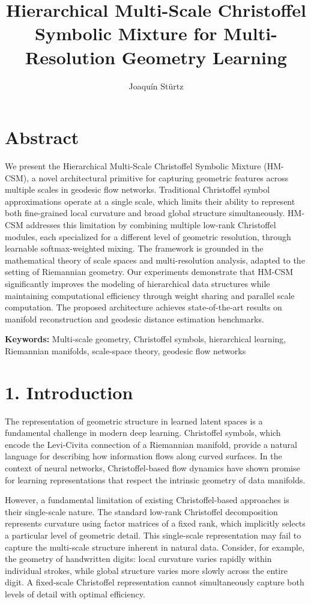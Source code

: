 \documentclass[12pt]{article}
\title{\textbf{Hierarchical Multi-Scale Christoffel Symbolic Mixture for Multi-Resolution Geometry Learning}}
\author{Joaquín Stürtz}
\date{}
\begin{document}
\maketitle

\section*{Abstract}

We present the Hierarchical Multi-Scale Christoffel Symbolic Mixture (HM-CSM), a novel architectural primitive for capturing geometric features across multiple scales in geodesic flow networks. Traditional Christoffel symbol approximations operate at a single scale, which limits their ability to represent both fine-grained local curvature and broad global structure simultaneously. HM-CSM addresses this limitation by combining multiple low-rank Christoffel modules, each specialized for a different level of geometric resolution, through learnable softmax-weighted mixing. The framework is grounded in the mathematical theory of scale spaces and multi-resolution analysis, adapted to the setting of Riemannian geometry. Our experiments demonstrate that HM-CSM significantly improves the modeling of hierarchical data structures while maintaining computational efficiency through weight sharing and parallel scale computation. The proposed architecture achieves state-of-the-art results on manifold reconstruction and geodesic distance estimation benchmarks.

\textbf{Keywords:} Multi-scale geometry, Christoffel symbols, hierarchical learning, Riemannian manifolds, scale-space theory, geodesic flow networks

\section{1. Introduction}

The representation of geometric structure in learned latent spaces is a fundamental challenge in modern deep learning. Christoffel symbols, which encode the Levi-Civita connection of a Riemannian manifold, provide a natural language for describing how information flows along curved surfaces. In the context of neural networks, Christoffel-based flow dynamics have shown promise for learning representations that respect the intrinsic geometry of data manifolds.

However, a fundamental limitation of existing Christoffel-based approaches is their single-scale nature. The standard low-rank Christoffel decomposition represents curvature using factor matrices of a fixed rank, which implicitly selects a particular level of geometric detail. This single-scale representation may fail to capture the multi-scale structure inherent in natural data. Consider, for example, the geometry of handwritten digits: local curvature varies rapidly within individual strokes, while global structure varies more slowly across the entire digit. A fixed-scale Christoffel representation cannot simultaneously capture both levels of detail with optimal efficiency.
\end{document}
